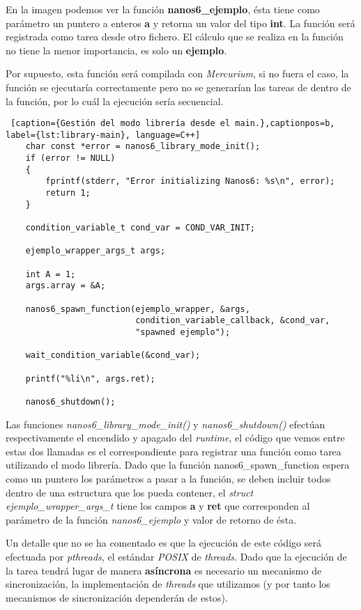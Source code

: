 En la imagen podemos ver la función \textbf{nanos6\_ejemplo}, ésta tiene como parámetro un puntero a enteros \textbf{a} y retorna un valor del tipo \textbf{int}. La función será registrada como tarea desde otro fichero. El cálculo que se realiza en la función no tiene la menor importancia, es solo un \textbf{ejemplo}. \medskip

Por supuesto, esta función será compilada con \textit{Mercurium}, si no fuera el caso, la función se ejecutaría correctamente pero no se generarían las tareas de dentro de la función, por lo cuál la ejecución sería secuencial. 

\begin{lstlisting} [caption={Gestión del modo librería desde el main.},captionpos=b, label={lst:library-main}, language=C++]
    char const *error = nanos6_library_mode_init();
    if (error != NULL)
    {
        fprintf(stderr, "Error initializing Nanos6: %s\n", error);
        return 1;
    }

    condition_variable_t cond_var = COND_VAR_INIT;

    ejemplo_wrapper_args_t args;

    int A = 1;
    args.array = &A;
    
    nanos6_spawn_function(ejemplo_wrapper, &args, 
    					  condition_variable_callback, &cond_var, 
    					  "spawned ejemplo");

    wait_condition_variable(&cond_var);

    printf("%li\n", args.ret);

    nanos6_shutdown();

\end{lstlisting}

Las funciones \textit{nanos6\_library\_mode\_init()} y \textit{nanos6\_shutdown()} efectúan respectivamente el encendido y apagado del \textit{runtime}, el código que vemos entre estas dos llamadas es el correspondiente para registrar una función como tarea utilizando el modo librería. Dado que la función nanos6\_spawn\_function espera como un puntero los parámetros a pasar a la función, se deben incluir todos dentro de una estructura que los pueda contener, el \textit{struct} \textit{ejemplo\_wrapper\_args\_t} tiene los campos \textbf{a} y \textbf{ret} que corresponden al parámetro de la función \textit{nanos6\_ejemplo} y valor de retorno de ésta.

\bigskip
Un detalle que no se ha comentado es que la ejecución de este código será efectuada por \textit{pthreads}, el estándar \textit{POSIX} de \textit{threads}. Dado que la ejecución de la tarea tendrá lugar de manera \textbf{asíncrona} es necesario un mecanismo de sincronización, la implementación de \textit{threads} que utilizamos (y por tanto los mecanismos de sincronización dependerán de estos).


